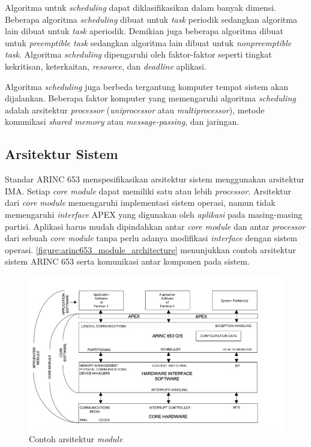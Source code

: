 Algoritma untuk \textit{scheduling} dapat diklasifikasikan dalam banyak dimensi.  Beberapa
algoritma \textit{scheduling} dibuat untuk \textit{task} periodik sedangkan algoritma lain
dibuat untuk \textit{task} aperiodik.  Demikian juga beberapa algoritma dibuat untuk
\textit{preemptible task} sedangkan algoritma lain dibuat untuk \textit{nonpreemptible task}.
Algoritma \textit{scheduling} dipengaruhi oleh faktor-faktor seperti tingkat kekritisan,
keterkaitan, \textit{resource}, dan \textit{deadline} aplikasi.

Algoritma \textit{scheduling} juga berbeda tergantung komputer tempat sistem akan dijalankan.
Beberapa faktor komputer yang memengaruhi algoritma \textit{scheduling} adalah arsitektur
\textit{processor} (\textit{uniprocessor} atau \textit{multiprocessor}), metode komunikasi
\textit{shared memory} atau \textit{message-passing}, dan jaringan.

\subsection{Arsitektur Sistem}

Standar ARINC 653 menspesifikasikan arsitektur sistem menggunakan arsitektur IMA.  Setiap
\textit{core module} dapat memiliki satu atau lebih \textit{processor}. Arsitektur dari
\textit{core module} memengaruhi implementasi sistem operasi, namun tidak memengaruhi
\textit{interface} APEX yang digunakan oleh \textit{aplikasi} pada masing-masing partisi.
Aplikasi harus mudah dipindahkan antar \textit{core module} dan antar \textit{processor} dari
sebuah \textit{core module} tanpa perlu adanya modifikasi \textit{interface} dengan sistem
operasi.  \autoref{figure:arinc653_module_architecture} menunjukkan contoh arsitektur sistem
ARINC 653 serta komunikasi antar komponen pada sistem.

\begin{figure}[htbp]
    \centering
    \includegraphics[scale=0.4]{resources/arinc653-architecture.png}
    \caption[Contoh arsitektur \textit{module}]{Contoh arsitektur \textit{module} \citep{AirlinesElectronicEngineeringCommittee2012}}
    \label{figure:arinc653_module_architecture}
\end{figure}

